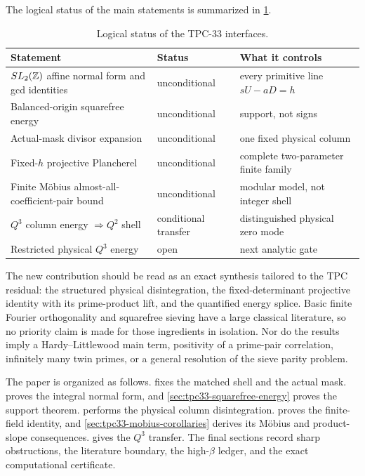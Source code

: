The logical status of the main statements is summarized in
\cref{tab:tpc33-result-ledger}.

\begin{table}[t]
\centering
\caption{Logical status of the TPC-33 interfaces.}
\label{tab:tpc33-result-ledger}
\begin{tabular}{@{}>{\raggedright\arraybackslash}p{}
>{\raggedright\arraybackslash}p{}
>{\raggedright\arraybackslash}p{}@{}}
\toprule
Statement & Status & What it controls \\
\midrule
\(SL_2(\mathbb Z)\) affine normal form and gcd identities
& unconditional & every primitive line \(sU-aD=h\) \\
Balanced-origin squarefree energy
& unconditional & support, not signs \\
Actual-mask divisor expansion
& unconditional & one fixed physical column \\
Fixed-\(h\) projective Plancherel
& unconditional & complete two-parameter finite family \\
Finite M\"obius almost-all-coefficient-pair bound
& unconditional & modular model, not integer shell \\
\(Q^3\) column energy \(\Rightarrow Q^2\) shell
& conditional transfer & distinguished physical zero mode \\
Restricted physical \(Q^3\) energy
& open & next analytic gate \\
\bottomrule
\end{tabular}
\end{table}

The new contribution should be read as an exact synthesis tailored to the
TPC residual: the structured physical disintegration, the fixed-determinant
projective identity with its prime-product lift, and the quantified energy
splice.  Basic finite Fourier orthogonality and squarefree sieving have a
large classical literature, so no priority claim is made for those
ingredients in isolation.  Nor do the results imply a Hardy--Littlewood
main term, positivity of a prime-pair correlation, infinitely many twin
primes, or a general resolution of the sieve parity problem.

The paper is organized as follows.  
fixes the matched shell and the actual mask.  
proves the integral normal form, and \cref{sec:tpc33-squarefree-energy}
proves the support theorem.   performs the
physical column disintegration.  
proves the finite-field identity, and
\cref{sec:tpc33-mobius-corollaries} derives its M\"obius and product-slope
consequences.   gives the \(Q^3\) transfer.
The final sections record sharp obstructions, the literature boundary, the
high-\(\beta\) ledger, and the exact computational certificate.
